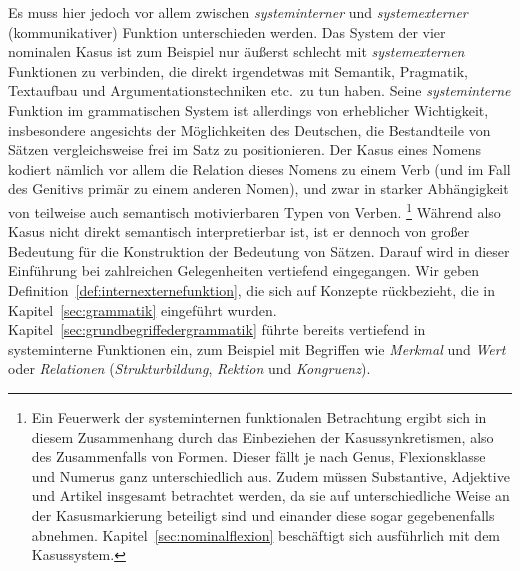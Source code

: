 Es muss hier jedoch vor allem zwischen \textit{systeminterner} und \textit{systemexterner} (\zB kommunikativer) Funktion unterschieden werden.
Das System der vier nominalen Kasus ist zum Beispiel nur äußerst schlecht mit \textit{systemexternen} Funktionen zu verbinden, die direkt irgendetwas mit Semantik, Pragmatik, Textaufbau und Argumentationstechniken etc.\ zu tun haben.
Seine \textit{systeminterne} Funktion im grammatischen System ist allerdings von erheblicher Wichtigkeit, insbesondere angesichts der Möglichkeiten des Deutschen, die Bestandteile von Sätzen vergleichsweise frei im Satz zu positionieren.
Der Kasus eines Nomens kodiert nämlich vor allem die Relation dieses Nomens zu einem Verb (und im Fall des Genitivs primär zu einem anderen Nomen), und zwar in starker Abhängigkeit von teilweise auch semantisch motivierbaren Typen von Verben.%
\footnote{Ein Feuerwerk der systeminternen funktionalen Betrachtung ergibt sich in diesem Zusammenhang durch das Einbeziehen der Kasussynkretismen, also des Zusammenfalls von Formen.
Dieser fällt je nach Genus, Flexionsklasse und Numerus ganz unterschiedlich aus.
Zudem müssen Substantive, Adjektive und Artikel insgesamt betrachtet werden, da sie auf unterschiedliche Weise an der Kasusmarkierung beteiligt sind und einander diese sogar gegebenenfalls abnehmen.
Kapitel~\ref{sec:nominalflexion} beschäftigt sich ausführlich mit dem Kasussystem.}
Während also Kasus nicht direkt semantisch interpretierbar ist, ist er dennoch von großer Bedeutung für die Konstruktion der Bedeutung von Sätzen.
Darauf wird in dieser Einführung bei zahlreichen Gelegenheiten vertiefend eingegangen.
Wir geben Definition~\ref{def:internexternefunktion}, die sich auf Konzepte rückbezieht, die in Kapitel~\ref{sec:grammatik} eingeführt wurden.
Kapitel~\ref{sec:grundbegriffedergrammatik} führte bereits vertiefend in systeminterne Funktionen ein, zum Beispiel mit Begriffen wie \textit{Merkmal} und \textit{Wert} oder \textit{Relationen} (\textit{Strukturbildung}, \textit{Rektion} und \textit{Kongruenz}).


